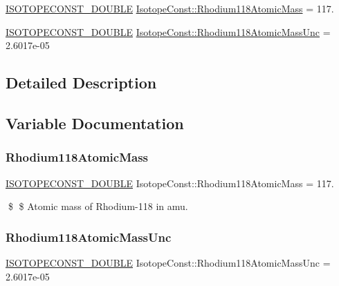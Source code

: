 \begin{DoxyCompactItemize}
\item 
\mbox{\hyperlink{group___isotope_const-_macros_ga8f45a7272ce02c0b4c65c44636ed719a}{I\+S\+O\+T\+O\+P\+E\+C\+O\+N\+S\+T\+\_\+\+D\+O\+U\+B\+LE}} \mbox{\hyperlink{group___isotope_const-_rhodium-_rh118_ga23e83fcb3fd00b8a1daa93d267a6f1f9}{Isotope\+Const\+::\+Rhodium118\+Atomic\+Mass}} = 117.
\item 
\mbox{\hyperlink{group___isotope_const-_macros_ga8f45a7272ce02c0b4c65c44636ed719a}{I\+S\+O\+T\+O\+P\+E\+C\+O\+N\+S\+T\+\_\+\+D\+O\+U\+B\+LE}} \mbox{\hyperlink{group___isotope_const-_rhodium-_rh118_ga4399010b57b22d905cc17b4d0f60b90f}{Isotope\+Const\+::\+Rhodium118\+Atomic\+Mass\+Unc}} = 2.\+6017e-\/05
\end{DoxyCompactItemize}


\subsection{Detailed Description}


\subsection{Variable Documentation}
\mbox{\label{group___isotope_const-_rhodium-_rh118_ga23e83fcb3fd00b8a1daa93d267a6f1f9}} 
\subsubsection{\texorpdfstring{Rhodium118\+Atomic\+Mass}{Rhodium118AtomicMass}}
{\footnotesize\ttfamily \mbox{\hyperlink{group___isotope_const-_macros_ga8f45a7272ce02c0b4c65c44636ed719a}{I\+S\+O\+T\+O\+P\+E\+C\+O\+N\+S\+T\+\_\+\+D\+O\+U\+B\+LE}} Isotope\+Const\+::\+Rhodium118\+Atomic\+Mass = 117.}

\$ \$ Atomic mass of Rhodium-\/118 in amu. \mbox{\label{group___isotope_const-_rhodium-_rh118_ga4399010b57b22d905cc17b4d0f60b90f}} 
\subsubsection{\texorpdfstring{Rhodium118\+Atomic\+Mass\+Unc}{Rhodium118AtomicMassUnc}}
{\footnotesize\ttfamily \mbox{\hyperlink{group___isotope_const-_macros_ga8f45a7272ce02c0b4c65c44636ed719a}{I\+S\+O\+T\+O\+P\+E\+C\+O\+N\+S\+T\+\_\+\+D\+O\+U\+B\+LE}} Isotope\+Const\+::\+Rhodium118\+Atomic\+Mass\+Unc = 2.\+6017e-\/05}

